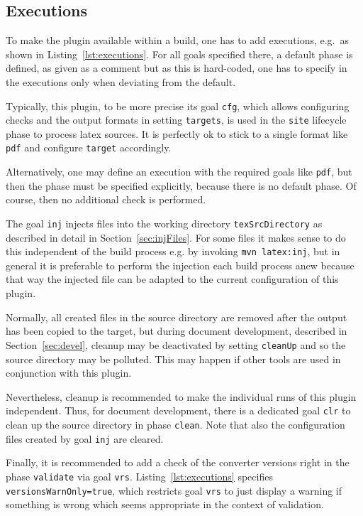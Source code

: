 \subsection{Executions}\label{subsec:xmlPomExecutions}

To make the plugin available within a build,
one has to add executions, e.g.~as shown in Listing~\ref{lst:executions}. 
For all goals specified there, a default phase is defined, 
as given as a comment but as this is hard-coded, 
one has to specify in the executions only 
when deviating from the default. 

Typically, this plugin, to be more precise its goal \texttt{cfg}, 
which allows configuring checks and the output formats in setting \texttt{targets},  
is used in the \texttt{site} lifecycle phase 
to process latex sources. 
It is perfectly ok to stick to a single format like \texttt{pdf} 
and configure \texttt{target} accordingly. 

Alternatively, one may define an execution with the required goals like \texttt{pdf}, 
but then the phase must be specified explicitly, because there is no default phase. 
Of course, then no additional check is performed. 

The goal \texttt{inj} injects files into the working directory \texttt{texSrcDirectory} 
as described in detail in Section~\ref{sec:injFiles}. 
For some files it makes sense to do this independent of the build process 
e.g. by invoking \texttt{mvn latex:inj}, 
but in general it is preferable to perform the injection each build process anew 
because that way the injected file can be adapted 
to the current configuration of this plugin. 

Normally, all created files in the source directory are removed 
after the output has been copied to the target, 
but during document development, described in Section~\ref{sec:devel}, 
cleanup may be deactivated by setting \texttt{cleanUp} 
and so the source directory may be polluted. 
This may happen if other tools are used in conjunction with this plugin. 

Nevertheless, cleanup is recommended to make the individual runs of this plugin independent.
Thus, for document development, there is a dedicated goal \texttt{clr} 
to clean up the source directory in phase \texttt{clean}. 
Note that also the configuration files created by goal \texttt{inj} are cleared. 

Finally, it is recommended to add a check of the converter versions
right in the phase \texttt{validate} via goal \texttt{vrs}.
Listing~\ref{lst:executions} specifies \texttt{versionsWarnOnly=true}, 
which restricts goal \texttt{vrs} to just display a warning 
if something is wrong 
which seems appropriate in the context of validation. 


